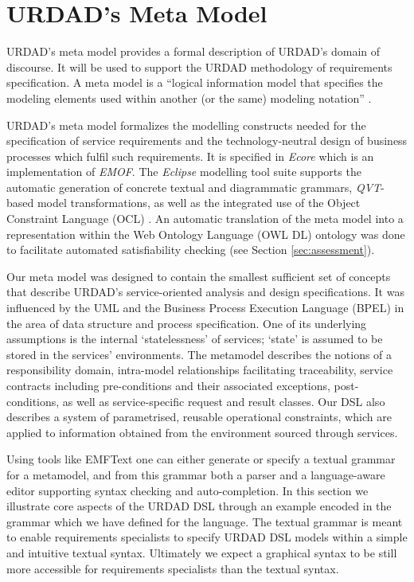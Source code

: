 \section{URDAD's Meta Model \label{sec:metamodel}}
URDAD's meta model provides a formal description of URDAD's domain of discourse. It will be used to support the URDAD methodology of requirements specification. A meta model is a ``logical information model that specifies the modeling elements used within another (or the same) modeling notation'' \cite{_ieee_2003}. 

URDAD's meta model formalizes the modelling constructs needed for the specification of service requirements and the technology-neutral design of business processes which fulfil such requirements. It is specified in \emph{Ecore} which is an implementation of \emph{EMOF}. The \emph{Eclipse} modelling tool suite\cite{gronback_model_2008} supports the automatic generation of concrete textual and diagrammatic grammars, \emph{QVT}-based model transformations, as well as the integrated use of the Object Constraint Language (OCL) \cite{_object_2010}. An automatic translation of the meta model into a representation within the Web Ontology Language (OWL DL) ontology was done to facilitate automated satisfiability checking (see Section \ref{sec:assessment}).

Our meta model was designed to contain the smallest sufficient set of concepts that describe URDAD's service-oriented analysis and design specifications.  It was influenced by the UML and the Business Process Execution Language (BPEL) in the area of data structure and process specification. One of its underlying assumptions is the internal `statelessness' of services; `state' is assumed to be stored in the services' environments. The metamodel describes the notions of a responsibility domain, intra-model relationships facilitating traceability, service contracts including pre-conditions and their associated exceptions, post-conditions, as well as service-specific request and result classes. Our DSL also describes a system of parametrised, reusable operational constraints, which are applied to information obtained from the environment sourced through services.

Using tools like EMFText \cite{heidenreich_derivation_2009} one can either generate or specify a textual grammar for a metamodel, and from this grammar both a parser and a language-aware editor supporting syntax checking and auto-completion. In this section we illustrate core aspects of the URDAD DSL through an example encoded in the grammar which we have defined for the language. The textual grammar is meant to enable requirements specialists to specify URDAD DSL models within a simple and intuitive textual syntax. Ultimately we expect a graphical syntax to be still more accessible for requirements specialists than the textual syntax.

